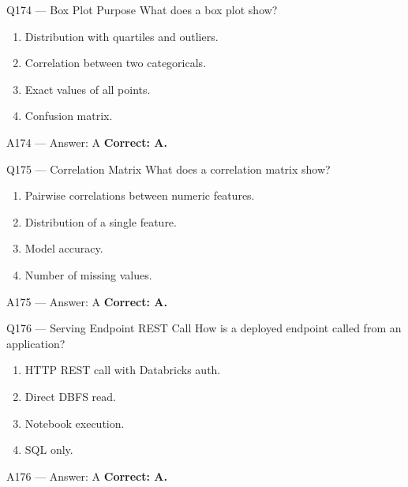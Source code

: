\documentclass[aspectratio=169,9pt]{beamer}
\begin{document}
	\begin{frame}{Q174 --- Box Plot Purpose}
		What does a box plot show?
		\begin{enumerate}[label=\Alph*.]
			\item Distribution with quartiles and outliers.
			\item Correlation between two categoricals.
			\item Exact values of all points.
			\item Confusion matrix.
		\end{enumerate}
	\end{frame}
	
	\begin{frame}{A174 --- Answer: A}
		\textbf{Correct: A.}
	\end{frame}
	
	\begin{frame}{Q175 --- Correlation Matrix}
		What does a correlation matrix show?
		\begin{enumerate}[label=\Alph*.]
			\item Pairwise correlations between numeric features.
			\item Distribution of a single feature.
			\item Model accuracy.
			\item Number of missing values.
		\end{enumerate}
	\end{frame}
	
	\begin{frame}{A175 --- Answer: A}
		\textbf{Correct: A.}
	\end{frame}
	
	
	\begin{frame}{Q176 --- Serving Endpoint REST Call}
		How is a deployed endpoint called from an application?
		\begin{enumerate}[label=\Alph*.]
			\item HTTP REST call with Databricks auth.
			\item Direct DBFS read.
			\item Notebook execution.
			\item SQL only.
		\end{enumerate}
	\end{frame}
	
	\begin{frame}{A176 --- Answer: A}
		\textbf{Correct: A.}
	\end{frame}
	
\end{document}
